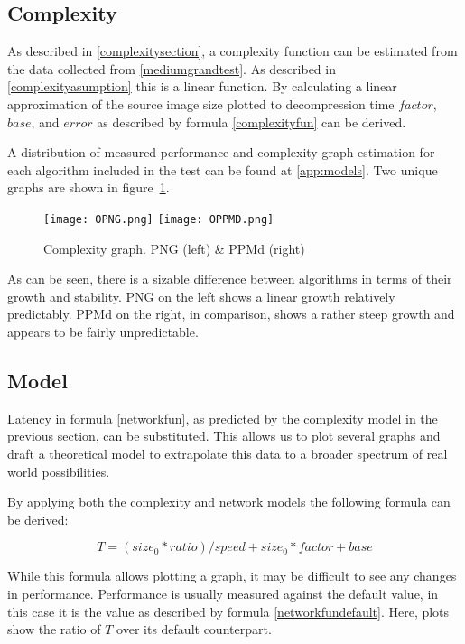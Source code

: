 \documentclass[11pt,a4paper]{report}
\begin{document}
\subsection{Complexity}

As described in \ref{complexitysection}, a complexity function can be estimated from the data collected from \ref{mediumgrandtest}. As described in \ref{complexityasumption} this is a linear function. By calculating a linear approximation of the source image size plotted to decompression time $factor$, $base$, and $error$ as described by formula \ref{complexityfun} can be derived.

A distribution of measured performance and complexity graph estimation for each algorithm included in the test can be found at \ref{app:models}. Two unique graphs are shown in figure~\ref{fig:oPlot}.

\begin{figure}[ht!]
\centering
\texttt{[image: OPNG.png]}
\texttt{[image: OPPMD.png]}
\caption{\label{fig:oPlot}Complexity graph. PNG (left) \& PPMd (right)}
\end{figure}

As can be seen, there is a sizable difference between algorithms in terms of their growth and stability. PNG on the left shows a linear growth relatively predictably. PPMd on the right, in comparison, shows a rather steep growth and appears to be fairly unpredictable. 

\subsection{Model}

Latency in formula \ref{networkfun}, as predicted by the complexity model in the previous section, can be substituted. This allows us to plot several graphs and draft a theoretical model to extrapolate this data to a broader spectrum of real world possibilities.

By applying both the complexity and network models the following formula can be derived:

\begin{equation}
T = (size_0 * ratio) / speed + size_0 * factor + base
\end{equation}

While this formula allows plotting a graph, it may be difficult to see any changes in performance. Performance is usually measured against the default value, in this case it is the value as described by formula \ref{networkfundefault}. Here, plots show the ratio of $T$ over its default counterpart.
\end{document}
